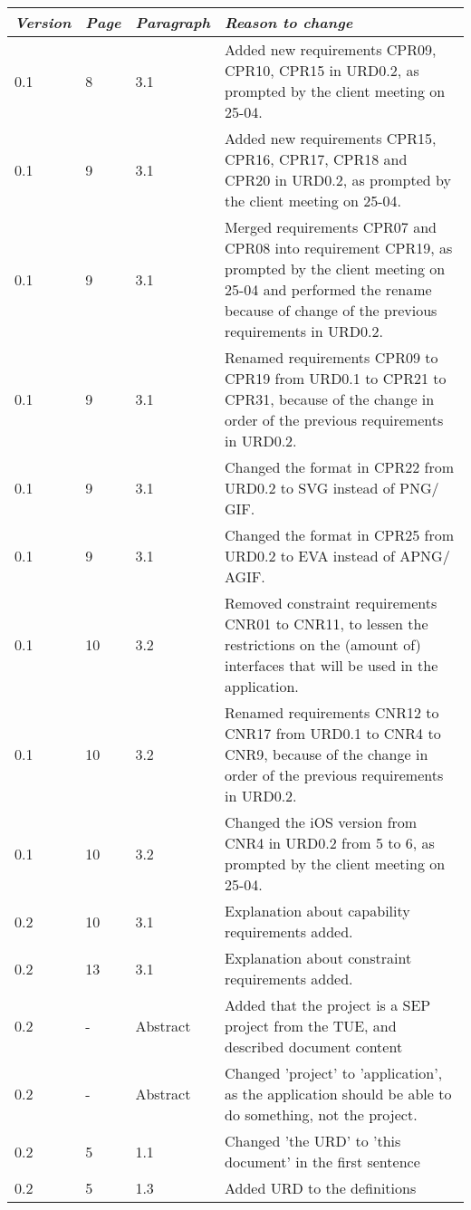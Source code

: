  \begin{tabular}{|l|l|l|p{11cm}|}
    \hline
    \emph{Version} & \emph{Page} &   \emph{Paragraph}    &   \emph{Reason to change}\\
    \hline
     0.1 & 8 & 3.1 & Added new requirements CPR09, CPR10, CPR15 in URD0.2, as prompted by the client meeting on 25-04.  \\
     0.1 & 9 & 3.1 & Added new requirements CPR15, CPR16, CPR17, CPR18 and CPR20 in URD0.2, as prompted by the client meeting on 25-04.\\
     0.1 & 9 & 3.1 & Merged requirements CPR07 and CPR08 into requirement CPR19, as prompted by the client meeting on 25-04 and performed the rename because of change of the previous requirements in URD0.2. \\
    0.1 & 9 & 3.1 & Renamed requirements CPR09 to CPR19 from URD0.1 to CPR21 to CPR31, because of the change in order of the previous requirements in URD0.2. \\
   0.1 & 9 & 3.1 & Changed the format in CPR22 from URD0.2 to SVG instead of PNG$/$GIF. \\
   0.1 & 9 & 3.1 & Changed the format in CPR25 from URD0.2 to EVA instead of APNG$/$AGIF. \\
  0.1 & 10 & 3.2 & Removed constraint requirements CNR01 to CNR11, to lessen the restrictions on the (amount of) interfaces that will be used in the application. \\
   0.1 & 10 & 3.2 & Renamed requirements CNR12 to CNR17 from URD0.1 to CNR4 to CNR9, because of the change in order of the previous requirements in URD0.2. \\
  0.1 & 10 & 3.2 & Changed the iOS version from CNR4 in URD0.2 from 5 to 6, as prompted by the client meeting on 25-04. \\
  0.2 & 10 & 3.1 & Explanation about capability requirements added. \\
    0.2 & 13 & 3.1 & Explanation about constraint requirements added. \\
    0.2 & - & Abstract & Added that the project is a SEP project from the TUE, and described document content \\
    0.2 & - & Abstract & Changed 'project' to 'application', as the application should be able to do something, not the project. \\
    0.2 & 5 & 1.1 & Changed 'the URD' to 'this document' in the first sentence \\
    0.2 & 5 & 1.3 & Added URD to the definitions \\

\end{tabular}
